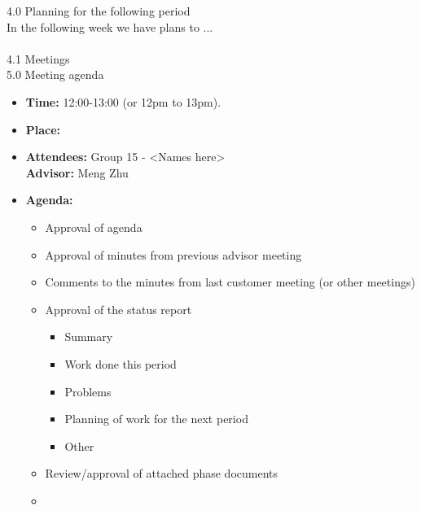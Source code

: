 {\Large{4.0   Planning for the following period}} \\
In the following week we have plans to ... \\ \\
{\large{4.1   Meetings}} \\
\newpage
{\Large{5.0   Meeting agenda}} \\
\begin{itemize}
\item \textbf{Time:} 12:00-13:00 (or 12pm to 13pm).
\item \textbf{Place:} \\
\item \textbf{Attendees:} Group 15 - <Names here> \\ \textbf{Advisor:} Meng Zhu
\item \textbf{Agenda:} 
	\begin{itemize}
	\item Approval of agenda
	\item Approval of minutes from previous advisor meeting
	\item Comments to the minutes from last customer meeting (or other meetings)
	\item Approval of the status report
		\begin{itemize}
		\item Summary
		\item Work done this period
		\item Problems
		\item Planning of work for the next period
		\item Other
	\end{itemize}
	\item Review/approval of attached phase documents
	\item <add other agenda items here>
	\end{itemize}
\end{itemize}

